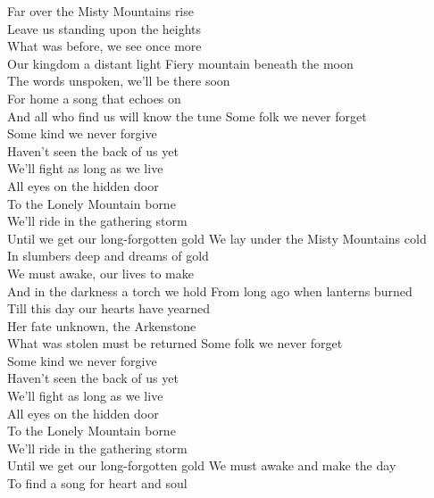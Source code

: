 
Far over the Misty Mountains rise\\
Leave us standing upon the heights\\
What was before, we see once more\\
Our kingdom a distant light
\hop
Fiery mountain beneath the moon\\
The words unspoken, we'll be there soon\\
For home a song that echoes on\\
And all who find us will know the tune
\hops
{} Some folk we never forget\\
 Some kind we never forgive\\
 Haven't seen the back of us yet\\
 We'll fight as long as we live\\
 All eyes on the hidden door\\
 To the Lonely Mountain borne\\
 We'll ride in the gathering storm\\
 Until we get our long-forgotten gold
\hops
We lay under the Misty Mountains cold\\
In slumbers deep and dreams of gold\\
We must awake, our lives to make\\
And in the darkness a torch we hold
\hop
From long ago when lanterns burned\\
Till this day our hearts have yearned\\
Her fate unknown, the Arkenstone\\
What was stolen must be returned
\hops
{} Some folk we never forget\\
 Some kind we never forgive\\
 Haven't seen the back of us yet\\
 We'll fight as long as we live\\
 All eyes on the hidden door\\
 To the Lonely Mountain borne\\
 We'll ride in the gathering storm\\
 Until we get our long-forgotten gold
\hops
We must awake and make the day\\
To find a song for heart and soul
